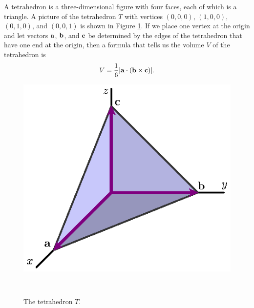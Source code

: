 \begin{pa} \label{PA:11.3} A tetrahedron is a three-dimensional figure with four faces, each of which is a triangle. A picture of the tetrahedron $T$ with vertices $(0,0,0)$, $(1,0,0)$, $(0,1,0)$, and $(0,0,1)$ is shown in Figure \ref{F:11.3.Tetrahedron_PA}. If we place one vertex at the origin and let vectors $\mathbf{a}$, $\mathbf{b}$, and $\mathbf{c}$ be determined by the edges of the tetrahedron that have one end at the origin, then a formula that tells us the volume $V$ of the tetrahedron is
\begin{equation} \label{eq:11.3.tetrahedron_volume}
V = \frac{1}{6} \lvert \mathbf{a} \cdot (\mathbf{b} \times \mathbf{c}) \rvert.
\end{equation}
\begin{figure}[h]
\begin{center}
\begin{minipage}{2.5in}
\begin{center}
  \includegraphics{figures/fig_11_3_tetrahedron.eps}
\end{center}
\caption{The tetrahedron $T$.}
\label{F:11.3.Tetrahedron_PA}
\ \vspace{0.05in} \
\end{minipage} \hspace{0.5in}
\begin{minipage}{2.5in}
\begin{center}

\end{center}
\end{minipage}
\end{center}
\end{figure}
\end{pa}

